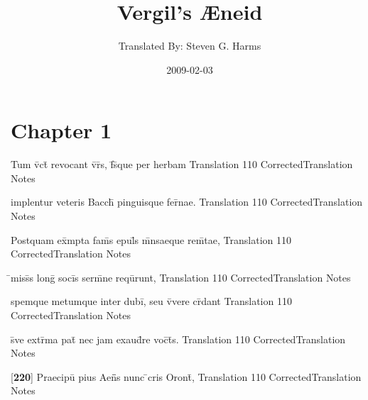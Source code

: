 \documentclass[]{book}
\title{Vergil's {\AE}neid}
\author{ Translated By:  Steven G. Harms }
\date{2009-02-03}
\begin{document}

\ifpdf
{}
\else
{}
\fi

\enumstyle 

\maketitle
\tableofcontents

\chapter{Chapter 1}
%
%
%
%
%
%
%
%

\latline
  {Tum v\={\macron {\i}}ct\={} revocant v\={\macron {\i}}r\={\macron {\i}}s, f\={}s\={\macron {\i}}que per herbam}
  { Translation }
  {110}
  { CorrectedTranslation }
  { Notes }


\latline
  {implentur veteris Bacch\={\macron {\i}} pinguisque fer\={\macron {\i}}nae.}
  { Translation }
  {110}
  { CorrectedTranslation }
  { Notes }


\latline
  {Postquam ex\={}mpta fam\={}s epul\={\macron {\i}}s m\={}nsaeque rem\={}tae,}
  { Translation }
  {110}
  { CorrectedTranslation }
  { Notes }


\latline
  {\={}miss\={}s long\={} soci\={}s serm\={}ne requ\={\macron {\i}}runt,}
  { Translation }
  {110}
  { CorrectedTranslation }
  { Notes }


\latline
  {spemque metumque inter dubi\={\macron {\i}}, seu v\={\macron {\i}}vere cr\={}dant}
  { Translation }
  {110}
  { CorrectedTranslation }
  { Notes }


\latline
  {s\={\macron {\i}}ve extr\={}ma pat\={\macron {\i}} nec jam exaud\={\macron {\i}}re voc\={}t\={}s.}
  { Translation }
  {110}
  { CorrectedTranslation }
  { Notes }

\latline
  {[\textbf{220}] Praecipu\={} pius Aen\={}\={}s nunc \={}cris Oront\={\macron {\i}},}
  { Translation }
  {110}
  { CorrectedTranslation }
  { Notes }
\end{document}
